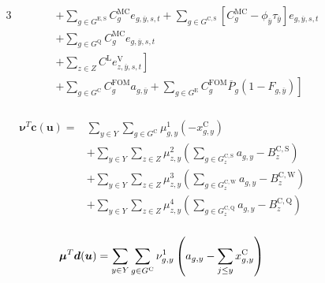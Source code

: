 \documentclass{article}
\newcommand{\sGeneratorsExisting}{G^{\mathrm{E}}}
\newcommand{\sGeneratorsExistingSolar}{G^{\mathrm{E,S}}}
\newcommand{\sGeneratorsCandidate}{G^{\mathrm{C}}}
\newcommand{\sGeneratorsCandidateWind}{G^{\mathrm{C,W}}}
\newcommand{\sGeneratorsCandidateSolar}{G^{\mathrm{C,S}}}
\newcommand{\sStorage}{G^{\mathrm{Q}}}
\newcommand{\sStorageCandidate}{G^{\mathrm{C,Q}}}
\newcommand{\sYears}{Y}
\newcommand{\sZones}{Z}
\newcommand{\iGenerator}{g}
\newcommand{\iYear}{y}
\newcommand{\iYearTerminal}{\overline{\iYear}}
\newcommand{\iYearAlias}{j}
\newcommand{\iScenario}{s}
\newcommand{\iInterval}{t}
\newcommand{\iZone}{z}
\newcommand{\cFixedOperationsMaintenanceCostGenerator}[1][\iGenerator]{C^{\mathrm{FOM}}_{#1}}
\newcommand{\cMarginalCost}[1][\iGenerator,\iYear]{C^{\mathrm{MC}}_{#1}}
\newcommand{\cPowerOutputMax}[1][\iGenerator,\iYear]{\overline{P}_{#1}}
\newcommand{\cBuildLimitWind}{B^{\mathrm{C,\mathrm{W}}}_{\iZone}}
\newcommand{\cBuildLimitSolar}{B^{\mathrm{C,\mathrm{S}}}_{\iZone}}
\newcommand{\cBuildLimitStorage}{B^{\mathrm{C,\mathrm{Q}}}_{\iZone}}
\newcommand{\cLostLoadCost}{C^{\mathrm{L}}}
\newcommand{\cRetirementIndicator}[1][\iGenerator,\iYear]{F_{#1}}
\newcommand{\vBaseline}[1][\iYear]{\phi_{#1}}
\newcommand{\vPermitPrice}[1][\iYear]{\tau_{#1}}
\newcommand{\vEnergy}[1][\iGenerator,\iYear,\iScenario,\iInterval]{e_{#1}}
\newcommand{\vInstalledCapacity}[1][\iGenerator,\iYear]{x^{\mathrm{C}}_{#1}}
\newcommand{\vLostLoadEnergy}[1][\iZone,\iYear,\iScenario,\iInterval]{e^{\mathrm{V}}_{#1}}
\newcommand{\vInstalledCapacityTotal}[1][\iGenerator,\iYear]{a_{#1}}
\newcommand{\dNonNegativeCandidateCapacity}[1][\iGenerator,\iYear]{\mu_{#1}^{1}}
\newcommand{\dSolarBuildLimit}[1][\iZone,\iYear]{\mu_{#1}^{2}}
\newcommand{\dWindBuildLimit}[1][\iZone,\iYear]{\mu_{#1}^{3}}
\newcommand{\dStorageBuildLimit}[1][\iZone,\iYear]{\mu_{#1}^{4}}
\newcommand{\dTotalInstallCapacity}[1][\iGenerator,\iYear]{\nu_{#1}^{1}}
\begin{document}
\begin{alignat}{3}
	& && && + \sum\limits_{\iGenerator \in \sGeneratorsExistingSolar} \cMarginalCost[\iGenerator] \vEnergy[\iGenerator,\iYearTerminal,\iScenario,\iInterval] + \sum\limits_{\iGenerator \in \sGeneratorsCandidateSolar} \left[\cMarginalCost[\iGenerator] - \vBaseline[\iYearTerminal]\vPermitPrice[\iYearTerminal]\right] \vEnergy[\iGenerator,\iYearTerminal,\iScenario,\iInterval] \nonumber\\
	& && && + \sum\limits_{\iGenerator \in \sStorage} \cMarginalCost[\iGenerator] \vEnergy[\iGenerator,\iYearTerminal,\iScenario,\iInterval] \nonumber\\
	& && && \left. + \sum\limits_{\iZone \in \sZones} \cLostLoadCost \vLostLoadEnergy[\iZone,\iYearTerminal,\iScenario,\iInterval] \right] \nonumber\\
	& && && \left. + \sum\limits_{\iGenerator \in \sGeneratorsCandidate} \cFixedOperationsMaintenanceCostGenerator \vInstalledCapacityTotal[\iGenerator,\iYearTerminal] + \sum\limits_{\iGenerator \in \sGeneratorsExisting} \cFixedOperationsMaintenanceCostGenerator \cPowerOutputMax[\iGenerator] \left(1 - \cRetirementIndicator[\iGenerator,\iYearTerminal]\right)\right]\\\nonumber
\end{alignat}

\begin{align}
\begin{split}
\bm{\nu}^{T}\bm{c}(\bm{u}) = & \sum\limits_{\iYear \in \sYears} \sum\limits_{\iGenerator \in \sGeneratorsCandidate} \dNonNegativeCandidateCapacity \left(-\vInstalledCapacity\right)\\
& + \sum\limits_{\iYear \in \sYears}\sum\limits_{\iZone \in \sZones} \dSolarBuildLimit \left(\sum\limits_{\iGenerator \in \sGeneratorsCandidateSolar_{\iZone}} \vInstalledCapacityTotal - \cBuildLimitSolar\right)\\
& + \sum\limits_{\iYear \in \sYears}\sum\limits_{\iZone \in \sZones} \dWindBuildLimit \left(\sum\limits_{\iGenerator \in \sGeneratorsCandidateWind_{\iZone}} \vInstalledCapacityTotal - \cBuildLimitWind\right)\\
& + \sum\limits_{\iYear \in \sYears}\sum\limits_{\iZone \in \sZones} \dStorageBuildLimit \left(\sum\limits_{\iGenerator \in \sStorageCandidate_{\iZone}} \vInstalledCapacityTotal - \cBuildLimitStorage\right)\\
\end{split}
\end{align}

\begin{equation}
	\bm{\mu}^{T}\bm{d}(\bm{u}) = \sum\limits_{\iYear \in \sYears} \sum\limits_{\iGenerator \in \sGeneratorsCandidate} \dTotalInstallCapacity \left(\vInstalledCapacityTotal - \sum\limits_{\iYearAlias\leq \iYear} \vInstalledCapacity\right)\\
\end{equation}
\end{document}
